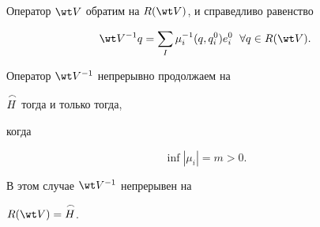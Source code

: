 \begin{thm} 


Оператор $\wt V$ обратим на $R(\wt V)$, и справедливо равенство 


\begin{equation} 


\wt V^{-1}q=\sum_I \mu^{-1}_i(q,q^0_i)e^0_i 


\ \; \forall q\in R(\wt V). 


\end{equation} 


Оператор $\wt V^{-1}$ непрерывно продолжаем на 


$\overset{\,\frown}{H}{}$ тогда и только тогда, 


когда 


\begin{equation} 


\inf|\mu_i|=m>0. 


\end{equation} 


В этом случае $\wt V^{-1}$ непрерывен на 


$R(\wt V)=\up{\frown}{H}$. 


\end{thm} 


 


